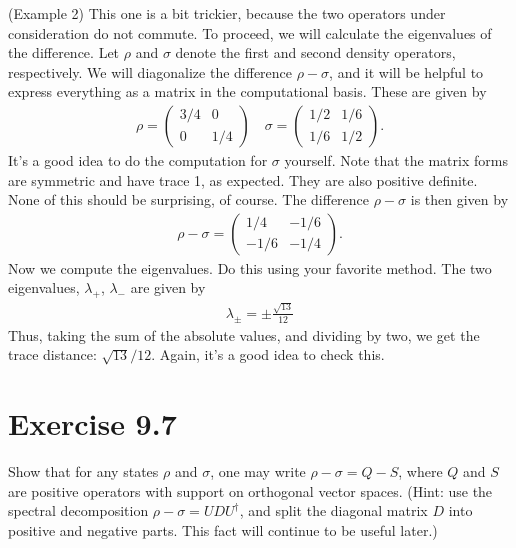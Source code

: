 \documentclass{book}
\begin{document}
    (Example 2) This one is a bit trickier, because the two operators under consideration do not commute. To proceed, we will calculate the eigenvalues of the difference. Let $\rho$ and $\sigma$ denote the first and second density operators, respectively. We will diagonalize the difference $\rho-\sigma$, and it will be helpful to express everything as a matrix in the computational basis. These are given by
    \begin{align}
        \rho =
        \begin{pmatrix}
            3/4 & 0 \\
            0 & 1/4
        \end{pmatrix} \quad 
        \sigma = 
        \begin{pmatrix}
            1/2 & 1/6 \\
            1/6 & 1/2
        \end{pmatrix}.
    \end{align}
    It's a good idea to do the computation for $\sigma$ yourself. Note that the matrix forms are symmetric and have trace 1, as expected. They are also positive definite. None of this should be surprising, of course. The difference $\rho - \sigma$ is then given by 
    \begin{align}
        \rho-\sigma = 
        \begin{pmatrix}
            1/4 & -1/6 \\
            -1/6 & -1/4
        \end{pmatrix}.
    \end{align}
    Now we compute the eigenvalues. Do this using your favorite method. The two eigenvalues, $\lambda_+$, $\lambda_-$ are given by
    \begin{align}
        \lambda_\pm = \pm \frac{\sqrt{13}}{12}
    \end{align}
    Thus, taking the sum of the absolute values, and dividing by two, we get the trace distance: $\sqrt{13}/12$. Again, it's a good idea to check this. 
    
\section*{Exercise 9.7}
    Show that for any states $\rho$ and $\sigma$, one may write $\rho-\sigma = Q-S$, where $Q$ and $S$ are positive operators with support on orthogonal vector spaces. (Hint: use the spectral decomposition $\rho -\sigma = U DU^\dagger$, and split the diagonal matrix $D$ into positive and negative parts. This fact will continue to be useful later.)
    
\end{document}
